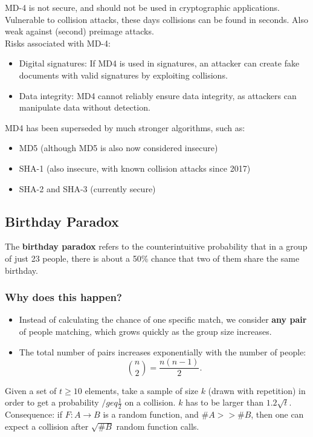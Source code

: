 MD-4 is not secure, and should not be used in cryptographic applications. Vulnerable to collision attacks, these days collisions can be found in seconds. Also weak against (second) preimage attacks. \\
Risks associated with MD-4:
\begin{itemize}
    \item Digital signatures: If MD4 is used in signatures, an attacker can create fake documents with valid signatures by exploiting collisions.
    \item Data integrity: MD4 cannot reliably ensure data integrity, as attackers can manipulate data without detection.
\end{itemize}

MD4 has been superseded by much stronger algorithms, such as:
\begin{itemize}
    \item MD5 (although MD5 is also now considered insecure)
    \item SHA-1 (also insecure, with known collision attacks since 2017)
    \item SHA-2 and SHA-3 (currently secure)
\end{itemize}

\subsection{Birthday Paradox}
The \textbf{birthday paradox} refers to the counterintuitive probability that in a group of just 23 people, there is about a 50\% chance that two of them share the same birthday.

\subsubsection{Why does this happen?}
\begin{itemize}
    \item Instead of calculating the chance of one specific match, we consider \textbf{any pair} of people matching, which grows quickly as the group size increases.
    \item The total number of pairs increases exponentially with the number of people:
    \[
    \binom{n}{2} = \frac{n(n-1)}{2}.
    \]
\end{itemize}

Given a set of $t \geq 10$ elements, take a sample of size $k$ (drawn with repetition) in order to get a probability $/geq \frac{1}{2}$ on a collision. $k$ has to be larger than $1.2\sqrt{t}$.
Consequence: if $F: A \rightarrow B$ is a random function, and $\#A >> \#B$, then one can expect a collision after $\sqrt{\#B}$ random function calls. 

